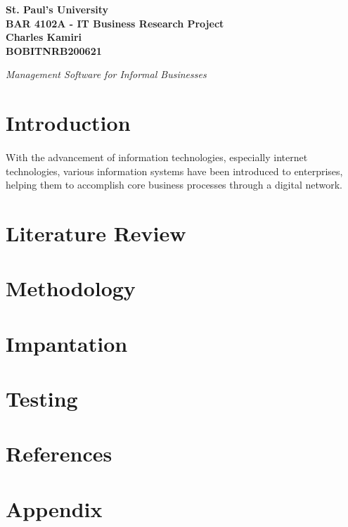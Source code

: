 \documentclass{article}
\begin{document}
\begin{center}
	{\bfseries\huge
		St. Paul's University \\
		BAR 4102A - IT Business Research Project \\
		Charles Kamiri  \\
		BOBITNRB200621 \\ [60pt]
	}

\emph{Management Software for Informal Businesses}
\end{center}
\newpage
\pagestyle{fancy}


\section*{Introduction}

\paragraph*{}
With the advancement of information technologies, especially internet technologies, various information systems have been introduced to enterprises, helping them to accomplish core business processes through a digital network.

\paragraph*{}

\newpage

\section*{Literature Review}
\lipsum[1-2]
\newpage


\section*{Methodology}
\lipsum[1-2]
\newpage


\section*{Impantation}
\lipsum[1-2]
\newpage


\section*{Testing}
\lipsum[1-2]
\newpage


\section*{References}
\lipsum[1-2]
\newpage


\section{Appendix}
\lipsum[1-2]
\newpage
\end{document}
